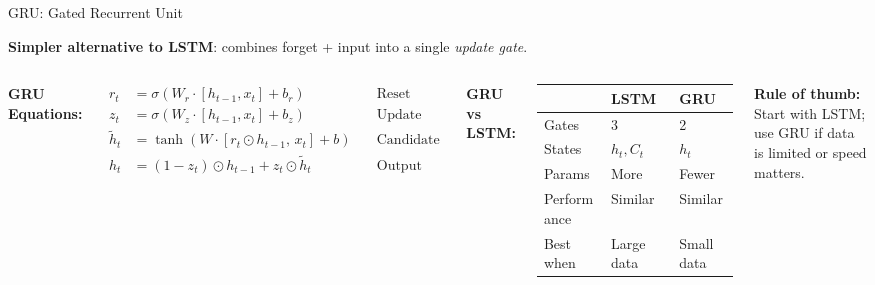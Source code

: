 \documentclass[aspectratio=169]{beamer}
\begin{document}
\begin{frame}{GRU: Gated Recurrent Unit}

\textbf{Simpler alternative to LSTM}: combines forget + input into a single \emph{update gate}.

\begin{columns}
\textbf{GRU Equations:}

\vspace{0.2cm}
{\small
\begin{align*}
r_t &= \sigma(W_r \cdot [h_{t-1}, x_t] + b_r) \quad &\text{Reset gate}\\
z_t &= \sigma(W_z \cdot [h_{t-1}, x_t] + b_z) \quad &\text{Update gate}\\
\tilde{h}_t &= \tanh(W \cdot [r_t \odot h_{t-1},\, x_t] + b) \quad &\text{Candidate}\\
h_t &= (1 - z_t) \odot h_{t-1} + z_t \odot \tilde{h}_t \quad &\text{Output}
\end{align*}
}

\textbf{GRU vs LSTM:}

\begin{tabular}{@{}lll@{}}
\toprule
 & \textbf{LSTM} & \textbf{GRU} \\
\midrule
Gates & 3 & 2 \\
States & $h_t, C_t$ & $h_t$ \\
Params & More & Fewer \\
Performance & Similar & Similar \\
Best when & Large data & Small data \\
\bottomrule
\end{tabular}

\vspace{0.3cm}
\textbf{Rule of thumb:} Start with LSTM; use GRU if data is limited or speed matters.
\end{columns}
\end{frame}
\end{document}
